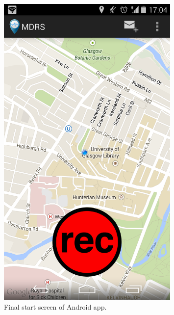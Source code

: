\documentclass{l3proj}
\begin{document}
\newpage
\begin{figure}[ht!]
\centering
\includegraphics[width=0.8\textwidth]{images/start-screen-final.png}
\caption{Final start screen of Android app.}
\end{figure}
\end{document}
